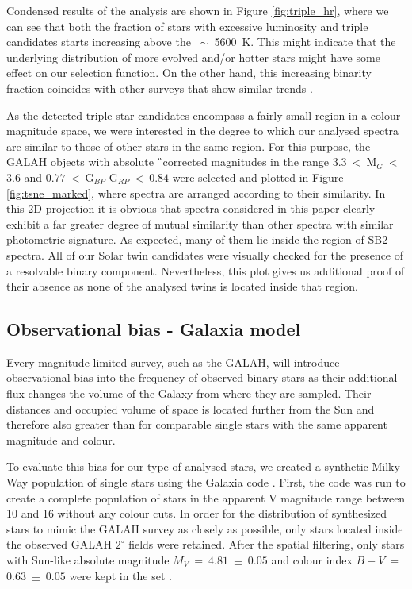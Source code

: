 Condensed results of the analysis are shown in Figure \ref{fig:triple_hr}, where we can see that both the fraction of stars with excessive luminosity and triple candidates starts increasing above the \Teff~$\sim$~5600~K. This might indicate that the underlying distribution of more evolved and/or hotter stars might have some effect on our selection function. On the other hand, this increasing binarity fraction coincides with other surveys that show similar trends \citep{2013ARA&A..51..269D}.

As the detected triple star candidates encompass a fairly small region in a colour-magnitude space, we were interested in the degree to which our analysed spectra are similar to those of other stars in the same region. For this purpose, the GALAH objects with absolute \G\ corrected magnitudes in the range $3.3$~<~M$_{G}$~<~$3.6$ and $0.77$~<~G$_{BP}$-G$_{RP}$~<~$0.84$ were selected and plotted in Figure \ref{fig:tsne_marked}, where spectra are arranged according to their similarity. In this 2D projection \citep[details about the construction of which are given in][]{2017ApJS..228...24T, buder2018} it is obvious that spectra considered in this paper clearly exhibit a far greater degree of mutual similarity than other spectra with similar photometric signature. As expected, many of them lie inside the region of SB2 spectra. All of our Solar twin candidates were visually checked for the presence of a resolvable binary component. Nevertheless, this plot gives us additional proof of their absence as none of the analysed twins is located inside that region.

\subsection{Observational bias - Galaxia model}
\label{sec:bias}
Every magnitude limited survey, such as the GALAH, will introduce observational bias into the frequency of observed binary stars as their additional flux changes the volume of the Galaxy from where they are sampled. Their distances and occupied volume of space is located further from the Sun and therefore also greater than for comparable single stars with the same apparent magnitude and colour.

To evaluate this bias for our type of analysed stars, we created a synthetic Milky Way population of single stars using the Galaxia code \citep{2011ApJ...730....3S}. First, the code was run to create a complete population of stars in the apparent V magnitude range between 10 and 16 without any colour cuts. In order for the distribution of synthesized stars to mimic the GALAH survey as closely as possible, only stars located inside the observed GALAH $2^\circ$ fields were retained. After the spatial filtering, only stars with Sun-like absolute magnitude $M_V~=~4.81$~$\pm$~$0.05$ and colour index $B-V$~=~$0.63$~$\pm$~$0.05$ were kept in the set \citep[reference magnitudes were taken from][]{2018ApJS..236...47W}.

